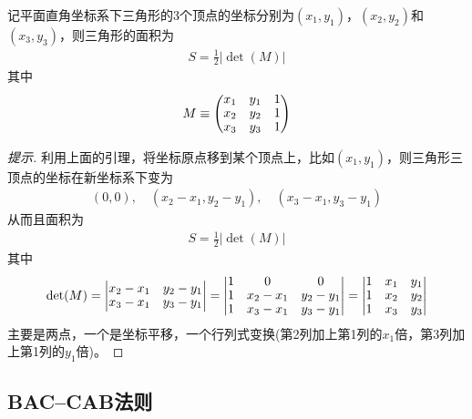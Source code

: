 \begin{theorem}[三角形面积的行列式公式]
  记平面直角坐标系下三角形的3个顶点的坐标分别为$(x_1, y_1)$，$(x_2,y_2)$和$(x_3,y_3)$，则三角形的面积为
  \begin{align*}
    S =\frac12 \left| \det(M) \right|
  \end{align*}
  其中
  \begin{align*}\renewcommand{\arraystretch}{.9}
    M\equiv
    \begin{pmatrix}
      x_1 & y_1 & 1\\
      x_2 & y_2 & 1\\
      x_3 & y_3 & 1
    \end{pmatrix}
  \end{align*}
\end{theorem}
\begin{proof}[提示]
  利用上面的引理，将坐标原点移到某个顶点上，比如$(x_1,y_1)$，则三角形三顶点的坐标在新坐标系下变为
  \begin{align*}
    (0,0),\quad (x_2-x_1, y_2-y_1),\quad (x_3-x_1, y_3-y_1)
  \end{align*}
  从而且面积为
  \begin{align*}
    S = \frac12 |\det(M)|
  \end{align*}
  其中
  \begin{align*}\renewcommand{\arraystretch}{.9}
    \det(M) =
    \begin{vmatrix}
      x_2 - x_1 & y_2 - y_1\\
      x_3 - x_1 & y_3 - y_1
    \end{vmatrix} =
    \begin{vmatrix}
      1 & 0         & 0        \\     
      1 & x_2 - x_1 & y_2 - y_1\\
      1 & x_3 - x_1 & y_3 - y_1
    \end{vmatrix} =
    \begin{vmatrix}
      1 & x_1 & y_1\\     
      1 & x_2 & y_2\\
      1 & x_3 & y_3
    \end{vmatrix}
  \end{align*}
  主要是两点，一个是坐标平移，一个行列式变换(第2列加上第1列的$x_1$倍，第3列加上第1列的$y_1$倍)。
\end{proof}


\subsection{BAC--CAB法则}
\label{sec:BAC-CAB-rule}

